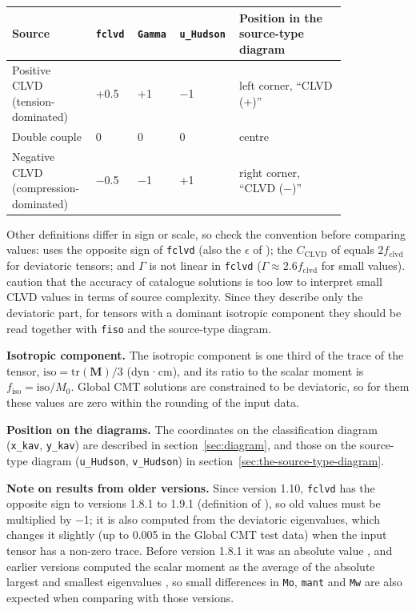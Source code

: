 \documentclass[11pt,a4paper,english]{article}
\numberwithin{equation}{section}
\begin{document}
\begin{longtable}{p{0.223\linewidth}p{0.091\linewidth}p{0.091\linewidth}p{0.116\linewidth}p{0.306\linewidth}}
\toprule
\textbf{Source} & \textbf{\texttt{fclvd}} & \textbf{\texttt{Gamma}} & \textbf{\texttt{u\_Hudson}} & \textbf{Position in the source-type diagram} \\
\midrule
\endhead
Positive CLVD (tension-dominated) & +0.5 & +1 & −1 & left corner, ``CLVD (+)'' \\
Double couple & 0 & 0 & 0 & centre \\
Negative CLVD (compression-dominated) & −0.5 & −1 & +1 & right corner, ``CLVD (−)'' \\
\bottomrule
\end{longtable}

Other definitions differ in sign or scale, so check the convention before comparing values:
\citet{giar84} uses the opposite sign of \texttt{fclvd} (also the \(\epsilon\) of \citealp{tape12});
the \(C_{\mathrm{CLVD}}\) of \citet{vavr15} equals \(2 f_{\mathrm{clvd}}\) for deviatoric tensors;
and \(\Gamma\) is not linear in \texttt{fclvd} (\(\Gamma \approx 2.6 f_{\mathrm{clvd}}\) for small
values). \citet{kaga85} caution that the accuracy of catalogue solutions is too low to interpret
small CLVD values in terms of source complexity. Since they describe only the deviatoric part, for
tensors with a dominant isotropic component they should be read together with \texttt{fiso} and the
source-type diagram.

\textbf{Isotropic component.} The isotropic component is one third of the trace of the tensor,
\(\mathrm{iso} = \mathrm{tr}(\mathbf{M})/3\) (dyn·cm), and its ratio to the scalar moment is
\(f_{\mathrm{iso}} = \mathrm{iso}/M_0\). Global CMT solutions are constrained to be deviatoric, so
for them these values are zero within the rounding of the input data.

\textbf{Position on the diagrams.} The coordinates on the classification diagram (\texttt{x\_kav},
\texttt{y\_kav}) are described in section~\ref{sec:diagram}, and those on the
source-type diagram (\texttt{u\_Hudson}, \texttt{v\_Hudson}) in
section~\ref{sec:the-source-type-diagram}.

\textbf{Note on results from older versions.} Since version 1.10, \texttt{fclvd} has the opposite
sign to versions 1.8.1 to 1.9.1 (definition of \citealp{giar84}), so old values must be multiplied
by −1; it is also computed from the deviatoric eigenvalues, which changes it slightly (up to 0.005
in the Global CMT test data) when the input tensor has a non-zero trace. Before version 1.8.1 it was
an absolute value \citep{froh92}, and earlier versions computed the scalar moment as the average of
the absolute largest and smallest eigenvalues \citep{dzie81}, so small differences in \texttt{Mo},
\texttt{mant} and \texttt{Mw} are also expected when comparing with those versions.
\end{document}
